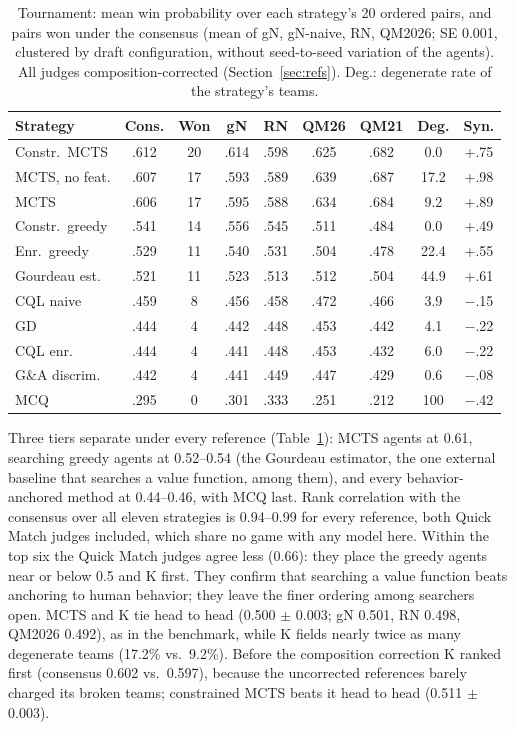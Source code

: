 \documentclass[journal]{IEEEtran}
\begin{document}
\begin{table}[t]
\centering
\caption{Tournament: mean win probability over each strategy's 20 ordered pairs, and pairs won under the consensus (mean of gN, gN-naive, RN, QM2026; SE 0.001, clustered by draft configuration, without seed-to-seed variation of the agents). All judges composition-corrected (Section~\ref{sec:refs}). Deg.: degenerate rate of the strategy's teams.}
\label{tab:tourn}
\setlength{\tabcolsep}{1.8pt}
\small
\begin{tabular}{lcccccccc}
\toprule
Strategy & Cons. & Won & gN & RN & QM26 & QM21 & Deg. & Syn. \\
\midrule
Constr.\ MCTS & .612 & 20 & .614 & .598 & .625 & .682 & 0.0 & +.75 \\
MCTS, no feat. & .607 & 17 & .593 & .589 & .639 & .687 & 17.2 & +.98 \\
MCTS & .606 & 17 & .595 & .588 & .634 & .684 & 9.2 & +.89 \\
Constr.\ greedy & .541 & 14 & .556 & .545 & .511 & .484 & 0.0 & +.49 \\
Enr.\ greedy & .529 & 11 & .540 & .531 & .504 & .478 & 22.4 & +.55 \\
Gourdeau est. & .521 & 11 & .523 & .513 & .512 & .504 & 44.9 & +.61 \\
CQL naive & .459 & 8 & .456 & .458 & .472 & .466 & 3.9 & $-$.15 \\
GD & .444 & 4 & .442 & .448 & .453 & .442 & 4.1 & $-$.22 \\
CQL enr. & .444 & 4 & .441 & .448 & .453 & .432 & 6.0 & $-$.22 \\
G\&A discrim. & .442 & 4 & .441 & .449 & .447 & .429 & 0.6 & $-$.08 \\
MCQ & .295 & 0 & .301 & .333 & .251 & .212 & 100 & $-$.42 \\
\bottomrule
\end{tabular}
\end{table}

Three tiers separate under every reference (Table~\ref{tab:tourn}): MCTS agents at 0.61, searching greedy agents at 0.52--0.54 (the Gourdeau estimator, the one external baseline that searches a value function, among them), and every behavior-anchored method at 0.44--0.46, with MCQ last. Rank correlation with the consensus over all eleven strategies is 0.94--0.99 for every reference, both Quick Match judges included, which share no game with any model here. Within the top six the Quick Match judges agree less (0.66): they place the greedy agents near or below 0.5 and K first. They confirm that searching a value function beats anchoring to human behavior; they leave the finer ordering among searchers open. MCTS and K tie head to head (0.500 $\pm$ 0.003; gN 0.501, RN 0.498, QM2026 0.492), as in the benchmark, while K fields nearly twice as many degenerate teams (17.2\% vs.\ 9.2\%). Before the composition correction K ranked first (consensus 0.602 vs.\ 0.597), because the uncorrected references barely charged its broken teams; constrained MCTS beats it head to head (0.511 $\pm$ 0.003).
\end{document}
